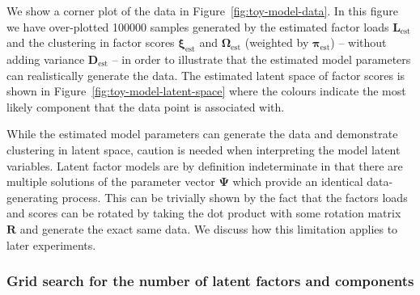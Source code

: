 \documentclass[twocolumn]{aastex61}
\newcommand{\vect}[1]{\boldsymbol{\mathbf{#1}}}
\renewcommand{\vec}[1]{\vect{#1}}
\newcommand{\weight}{\pi}
\newcommand{\factorloads}{\textbf{L}}
\newcommand{\specificvariance}{\vec{D}}
\newcommand{\scoremeans}{\vec\xi}
\newcommand{\scorecovs}{\vec\Omega}
\begin{document}
We show a corner plot of the data in Figure~\ref{fig:toy-model-data}.
In this figure we have over-plotted 100000 samples generated by the
estimated factor loads $\factorloads_\textrm{est}$ and the clustering in factor 
scores $\scoremeans_\textrm{est}$ and $\scorecovs_\textrm{est}$ (weighted by $\vec\weight_\textrm{est}$)
-- without adding variance $\specificvariance_\textrm{est}$ %
-- in order to illustrate that the
estimated model parameters can realistically generate the data.
The estimated latent space of factor scores is shown in 
Figure~\ref{fig:toy-model-latent-space} where the colours indicate the
most likely component that the data point is associated with.

While the estimated model parameters can generate the data and demonstrate
clustering in latent space, caution is needed when interpreting the 
model latent variables.
Latent factor models are by definition indeterminate in that there are
multiple solutions of the parameter vector $\vec\Psi$ which provide
an identical data-generating process. This can be trivially shown by
the fact that the factors loads and scores can be rotated by taking the
dot product
with some rotation
matrix $\textbf{R}$ and generate the exact same data. 
We discuss how this limitation applies to later experiments.


\subsubsection{Grid search for the number of latent factors and components}
\end{document}
